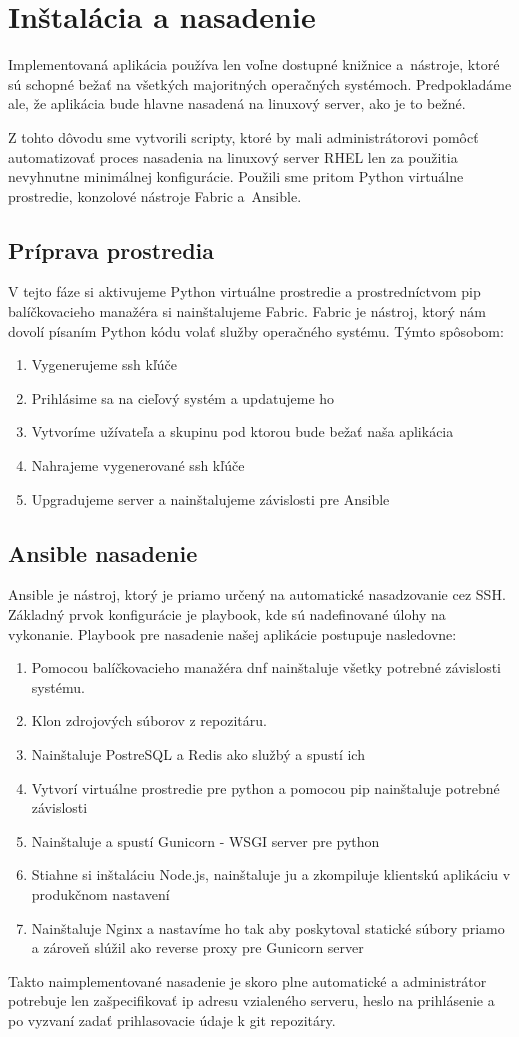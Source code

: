 \chapter{Inštalácia a nasadenie}
Implementovaná aplikácia používa len voľne dostupné knižnice a~nás\-troje, ktoré sú schopné bežať na všetkých majoritných operačných systémoch. Predpokladáme ale, že aplikácia bude hlavne nasadená na linuxový server, ako je to bežné.
\par Z tohto dôvodu sme vytvorili scripty, ktoré by mali administrátorovi pomôcť automatizovať proces nasadenia na linuxový server RHEL len za použitia nevyhnutne minimálnej konfigurácie. Použili sme pritom Python virtuálne prostredie, konzolové nástroje Fabric a~Ansible.

\section{Príprava prostredia}
V tejto fáze si aktivujeme Python virtuálne prostredie a prostredníctvom pip balíčkovacieho manažéra si nainštalujeme Fabric.
Fabric je nástroj, ktorý nám dovolí písaním Python kódu volať služby ope\-račného systému. Týmto spôsobom:

\begin{enumerate}
  \item Vygenerujeme ssh kľúče
  \item Prihlásime sa na cieľový systém a updatujeme ho
  \item Vytvoríme užívateľa a skupinu pod ktorou bude bežať naša aplikácia
  \item Nahrajeme vygenerované ssh kľúče
  \item Upgradujeme server a nainštalujeme závislosti pre Ansible
\end{enumerate}

\section{Ansible nasadenie}
Ansible je nástroj, ktorý je priamo určený na automatické nasadzovanie cez SSH. Základný prvok konfigurácie je playbook, kde sú nadefinované úlohy na vykonanie. Playbook pre nasadenie našej aplikácie postupuje nasledovne:

\begin{enumerate}
  \item Pomocou balíčkovacieho manažéra dnf nainštaluje všetky potrebné závislosti systému.
  \item Klon zdrojových súborov z repozitáru.
  \item Nainštaluje PostreSQL a Redis ako službý a spustí ich
  \item Vytvorí virtuálne prostredie pre python a pomocou pip nainštaluje potrebné závislosti
  \item Nainštaluje a spustí Gunicorn - WSGI server pre python
  \item Stiahne si inštaláciu Node.js, nainštaluje ju a zkompiluje klientskú aplikáciu v produkčnom nastavení
  \item Nainštaluje Nginx a nastavíme ho tak aby poskytoval statické súbory priamo a zároveň slúžil ako reverse proxy pre Gunicorn server
\end{enumerate}

Takto naimplementované nasadenie je skoro plne automatické a administrátor potrebuje len zašpecifikovať ip adresu vzialeného serveru, heslo na prihlásenie a po vyzvaní zadať prihlasovacie údaje k git repozitáry.


